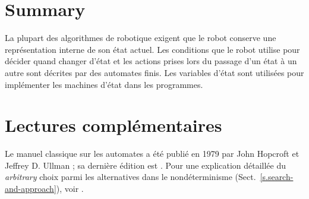 \section{Summary}

La plupart des algorithmes de robotique exigent que le robot conserve une représentation interne de son état actuel. Les conditions que le robot utilise pour décider quand changer d'état et les actions prises lors du passage d'un état à un autre sont décrites par des automates finis. Les variables d'état sont utilisées pour implémenter les machines d'état dans les programmes.

\section{Lectures complémentaires}

Le manuel classique sur les automates a été publié en 1979 par John Hopcroft et Jeffrey D. Ullman ; sa dernière édition est \cite{automata}. Pour une explication détaillée du \emph{arbitrary} choix parmi les alternatives dans le nondéterminisme (Sect.~\ref{s.search-and-approach}), voir \cite[Sect.~2.4]{pcdp2}.

